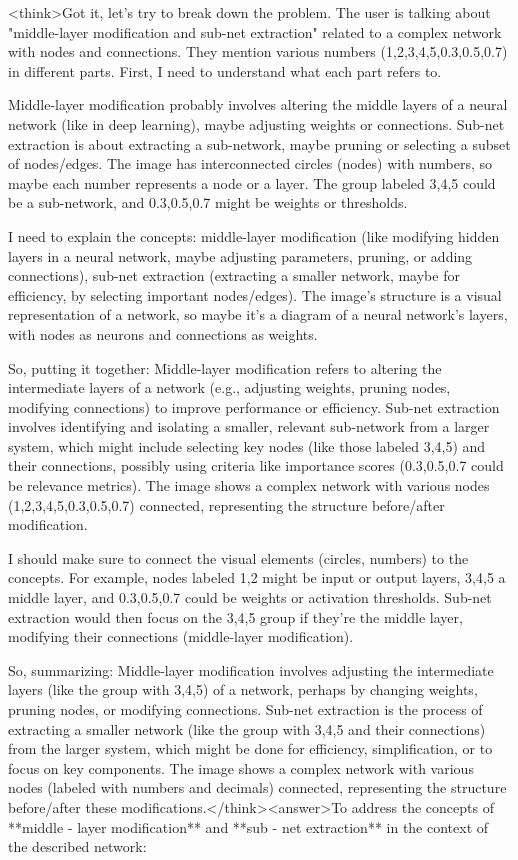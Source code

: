 <think>Got it, let's try to break down the problem. The user is talking about "middle-layer modification and sub-net extraction" related to a complex network with nodes and connections. They mention various numbers (1,2,3,4,5,0.3,0.5,0.7) in different parts. First, I need to understand what each part refers to. 

Middle-layer modification probably involves altering the middle layers of a neural network (like in deep learning), maybe adjusting weights or connections. Sub-net extraction is about extracting a sub-network, maybe pruning or selecting a subset of nodes/edges. The image has interconnected circles (nodes) with numbers, so maybe each number represents a node or a layer. The group labeled 3,4,5 could be a sub-network, and 0.3,0.5,0.7 might be weights or thresholds. 

I need to explain the concepts: middle-layer modification (like modifying hidden layers in a neural network, maybe adjusting parameters, pruning, or adding connections), sub-net extraction (extracting a smaller network, maybe for efficiency, by selecting important nodes/edges). The image's structure is a visual representation of a network, so maybe it's a diagram of a neural network's layers, with nodes as neurons and connections as weights. 

So, putting it together: Middle-layer modification refers to altering the intermediate layers of a network (e.g., adjusting weights, pruning nodes, modifying connections) to improve performance or efficiency. Sub-net extraction involves identifying and isolating a smaller, relevant sub-network from a larger system, which might include selecting key nodes (like those labeled 3,4,5) and their connections, possibly using criteria like importance scores (0.3,0.5,0.7 could be relevance metrics). The image shows a complex network with various nodes (1,2,3,4,5,0.3,0.5,0.7) connected, representing the structure before/after modification. 

I should make sure to connect the visual elements (circles, numbers) to the concepts. For example, nodes labeled 1,2 might be input or output layers, 3,4,5 a middle layer, and 0.3,0.5,0.7 could be weights or activation thresholds. Sub-net extraction would then focus on the 3,4,5 group if they're the middle layer, modifying their connections (middle-layer modification). 

So, summarizing: Middle-layer modification involves adjusting the intermediate layers (like the group with 3,4,5) of a network, perhaps by changing weights, pruning nodes, or modifying connections. Sub-net extraction is the process of extracting a smaller network (like the group with 3,4,5 and their connections) from the larger system, which might be done for efficiency, simplification, or to focus on key components. The image shows a complex network with various nodes (labeled with numbers and decimals) connected, representing the structure before/after these modifications.</think><answer>To address the concepts of **middle - layer modification** and **sub - net extraction** in the context of the described network:  


